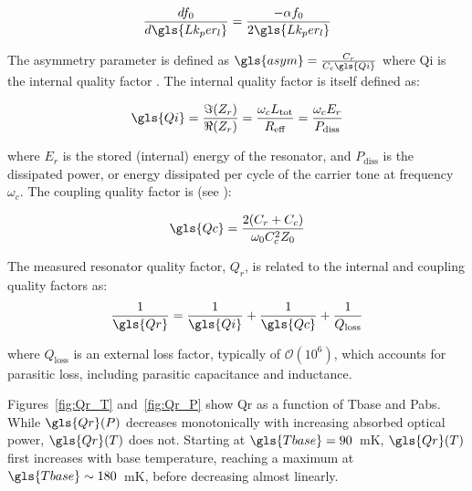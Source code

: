 \begin{equation}
 \frac{df_{0}}{d\gls{Lk_per_l}} = \frac{-\alpha f_{0}}{2\gls{Lk_per_l}}
\end{equation}

The asymmetry parameter is defined as $\gls{asym} = \frac{C_{r}}{C_{c}\gls{Qi}}$
where \gls{Qi} is the internal quality factor \citep{mauskopf2018transition}. The internal quality factor is itself defined as:

\begin{equation}\label{eq:Qi}
  \gls{Qi} = \frac{\Im(Z_{r})}{\Re(Z_{r})} = \frac{\omega_{c}L_{\mathrm{tot}}}{R_{\mathrm{eff}}} = \frac{\omega_{c} E_{r}}{P_{\mathrm{diss}}}
\end{equation}

where $E_{r}$ is the stored (internal) energy of the resonator, and $P_{\mathrm{diss}}$ is the dissipated power, or energy dissipated per cycle of the carrier tone at frequency $\omega_{c}$. The coupling quality factor is (see \citet{barry2014development}):

\begin{equation} \label{eq:Qc}
  \gls{Qc} = \frac{2(C_{r} + C_{c})}{\omega_{0}C_{c}^{2}Z_{0}}
\end{equation}

The measured resonator quality factor, $Q_{r}$, is related to the internal and coupling quality factors as:
\begin{equation}
  \frac{1}{\gls{Qr}} = \frac{1}{\gls{Qi}} + \frac{1}{\gls{Qc}} + \frac{1}{Q_{\mathrm{loss}}}
\end{equation}

where $Q_{\mathrm{loss}}$ is an external loss factor, typically of $\mathcal{O}(10^{6})$, which accounts for parasitic loss, including parasitic capacitance and inductance.

Figures~\ref{fig:Qr_T} and~\ref{fig:Qr_P} show \gls{Qr} as a function of \gls{Tbase} and \gls{Pabs}. While $\gls{Qr}(P)$ decreases monotonically with increasing absorbed optical power, $\gls{Qr}(T)$ does not. Starting at $\gls{Tbase} = 90$~mK, $\gls{Qr}(T)$ first increases with base temperature, reaching a maximum at $\gls{Tbase} \sim 180$~mK, before decreasing almost linearly.

